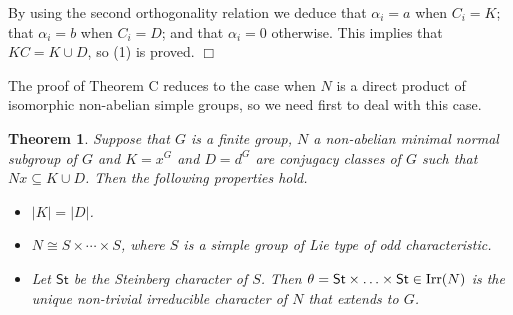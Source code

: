 \documentclass[12pt,leqno,a4paper]{amsart}
\newtheorem{theorem}{Theorem}[section]
\numberwithin{equation}{section}
\begin{document}
By using the second orthogonality relation we deduce that $\alpha_{i}= a$ when $C_{i}=K$; that $\alpha_{i}= b$ when $C_{i} =D$; and that $\alpha_{i}=0$ otherwise. This implies that $KC=K \cup D$,  so (1) is proved. $\Box$

\medskip

The proof of Theorem C reduces to the case when $N$ is a direct product of isomorphic non-abelian simple groups, so we need first to deal with this case.



\begin{theorem}\label{32}
 Suppose that $G$ is a finite group, $N$  a non-abelian minimal normal subgroup of $G$ and $K=x^G$ and $D=d^G$ are conjugacy classes of $G$ such that $Nx\subseteq K\cup  D$. Then the following properties hold.
 \begin{itemize}
 \item[(1)] $|K|=|D|$.
 \item[(2)] $N\cong S\times \cdots \times S$, where $S$ is a simple group of Lie type of odd characteristic.
 \item[(3)] Let $\mathsf{St}$ be the Steinberg character of $S$. Then $\theta= \mathsf{St}\times \ldots \times \mathsf{St}\in {\rm Irr}(N)$  is the unique non-trivial irreducible character of $N$ that extends to $G$.
 \end{itemize}
\end{theorem}
\end{document}
